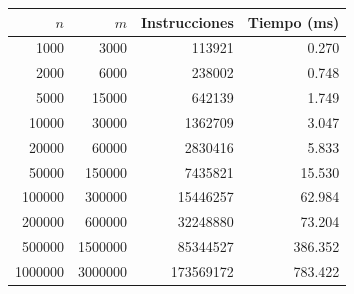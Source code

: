 \begin{tabular}{rrrr}
\toprule
$n$ & $m$ & Instrucciones & Tiempo (ms)\\
\midrule
1000 & 3000 & 113921 & 0.270\\
2000 & 6000 & 238002 & 0.748\\
5000 & 15000 & 642139 & 1.749\\
10000 & 30000 & 1362709 & 3.047\\
20000 & 60000 & 2830416 & 5.833\\
50000 & 150000 & 7435821 & 15.530\\
100000 & 300000 & 15446257 & 62.984\\
200000 & 600000 & 32248880 & 73.204\\
500000 & 1500000 & 85344527 & 386.352\\
1000000 & 3000000 & 173569172 & 783.422\\
\bottomrule
\end{tabular}
